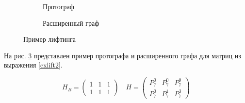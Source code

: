\begin{figure}[h!]
\centering
\begin{subfigure}{0.2\textwidth}
  \centering
  \caption{Протограф}
  \label{liftingBase}
\end{subfigure}%
\begin{subfigure}{.8\textwidth}
  \centering
  \caption{Расширенный граф}
  \label{liftingExpanded}
\end{subfigure}
\caption{Пример лифтинга}
\label{exliftgraph}
\end{figure}

На рис. \ref{exliftgraph} представлен пример протографа и расширенного графа для матриц из выражения \ref{exlift2}.

\begin{equation} \label{exlift2}
	H_B=\begin{pmatrix}
		1 & 1 & 1 \\
		1 & 1 & 1
	\end{pmatrix}
	\quad
	H=\begin{pmatrix}
		P^0_7 & P^0_7 & P^0_7 \\
		P^0_7 & P^1_7 & P^3_7
	\end{pmatrix}
\end{equation}



















































